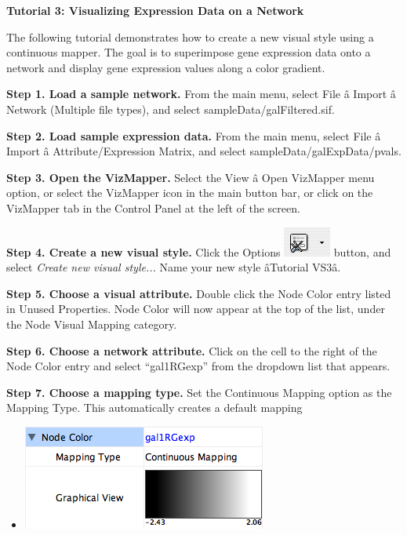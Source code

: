  
\textbf{Tutorial 3: Visualizing Expression Data on a Network}


 The following tutorial demonstrates how to create a new visual style using a continuous mapper. The goal is to superimpose gene expression data onto a network and display gene expression values along a color gradient. 


 \textbf{Step 1. Load a sample network.}
 From the main menu, select File \^a Import \^a Network (Multiple file types), and select sampleData/galFiltered.sif. 


 \textbf{ Step 2. Load sample expression data.}
 From the main menu, select File \^a Import \^a Attribute/Expression Matrix, and select sampleData/galExpData/pvals. 


 \textbf{Step 3. Open the VizMapper.}
 Select the View \^a Open VizMapper menu option, or select the VizMapper icon in the main button bar, or click on the VizMapper tab in the Control Panel at the left of the screen. 


 \textbf{Step 4. Create a new visual style.}
 Click the Options \includegraphics[width=.6\textwidth]{images/VizMapOptionIcon.png}  button, and select \emph{Create new visual style...}
 Name your new style \^aTutorial VS3\^a. 


 \textbf{Step 5. Choose a visual attribute.}
 Double click the Node Color entry listed in Unused Properties. Node Color will now appear at the top of the list, under the Node Visual Mapping category. 


 \textbf{Step 6. Choose a network attribute.}
 Click on the cell to the right of the Node Color entry and select ``gal1RGexp'' from the dropdown list that appears. 


 \textbf{Step 7. Choose a mapping type.}
 Set the Continuous Mapping option as the Mapping Type. This automatically creates a default mapping 
\begin{itemize}
\item 

 \includegraphics[width=.6\textwidth]{images/DefaultColorGradient.png} 


\end{itemize}



